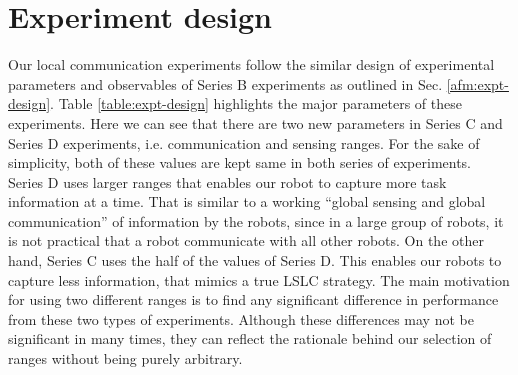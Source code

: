 \section{Experiment design}
\label{local-comm:expt-design}
%
Our local communication experiments follow the similar design of experimental parameters and observables of Series B experiments as outlined in Sec. \ref{afm:expt-design}. Table \ref{table:expt-design} highlights the major parameters of these experiments. Here we can see that there are two new parameters in Series C and Series D experiments, i.e. communication and sensing ranges. For the sake of simplicity, both of these values are kept same in both series of experiments.\\
Series D uses larger ranges that enables our robot to capture more task information at a time. That is similar to a working ``global sensing and global communication'' of information by the robots, since in a large group of robots, it is not practical that a robot communicate with all other robots. On the other hand, Series C uses the half of the values of Series D. This enables our robots to capture less information, that mimics a true LSLC strategy. The main motivation for using two different ranges is to find any significant difference in performance from these two types of experiments. Although these differences may not be significant in many times, they can reflect the rationale behind our selection of ranges without being purely arbitrary. 
